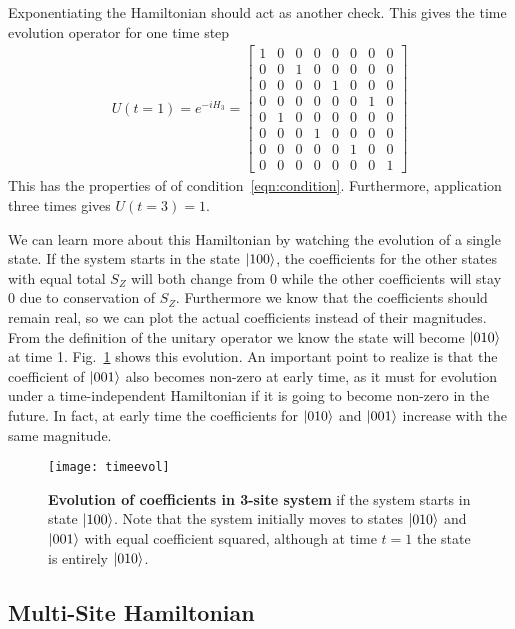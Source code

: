Exponentiating the Hamiltonian should act as another check. This gives the time evolution operator for one time step
\begin{align}
U(t=1) = e^{-iH_3} = \begin{bmatrix}
1 & 0 & 0 & 0 & 0 & 0 & 0 & 0 \\
0 & 0 & 1 & 0 & 0 & 0 & 0 & 0 \\
0 & 0 & 0 & 0 & 1 & 0 & 0 & 0 \\
0 & 0 & 0 & 0 & 0 & 0 & 1 & 0 \\
0 & 1 & 0 & 0 & 0 & 0 & 0 & 0 \\
0 & 0 & 0 & 1 & 0 & 0 & 0 & 0 \\
0 & 0 & 0 & 0 & 0 & 1 & 0 & 0 \\
0 & 0 & 0 & 0 & 0 & 0 & 0 & 1
\end{bmatrix}
\end{align}
This has the properties of of condition~\ref{eqn:condition}. Furthermore, application three times gives $U(t=3) = 1$. 

We can learn more about this Hamiltonian by watching the evolution of a single state. If the system starts in the state $\left|100\right\rangle$, the coefficients for the other states with equal total $S_Z$ will both change from 0 while the other coefficients will stay 0 due to conservation of $S_Z$. Furthermore we know that the coefficients should remain real, so we can plot the actual coefficients instead of their magnitudes.
From the definition of the unitary operator we know the state will become $\left|010\right\rangle$ at time 1. Fig.~\ref{fig:timeevol} shows this evolution. An important point to realize is that the coefficient of $\left|001\right\rangle$ also becomes non-zero at early time, as it must for evolution under a time-independent Hamiltonian if it is going to become non-zero in the future. In fact, at early time the coefficients for $\left|010\right\rangle$ and $\left|001\right\rangle$ increase with the same magnitude.
\begin{figure}
	\centering
	\texttt{[image: timeevol]}
	\caption{\textbf{Evolution of coefficients in 3-site system} if the system starts in state $\left|100\right\rangle$. Note that the system initially moves to states $\left|010\right\rangle$ and $\left|001\right\rangle$ with equal coefficient squared, although at time $t=1$ the state is entirely $\left|010\right\rangle$.}
	\label{fig:timeevol}
\end{figure}

\subsection{Multi-Site Hamiltonian} \label{sub:multistate}


